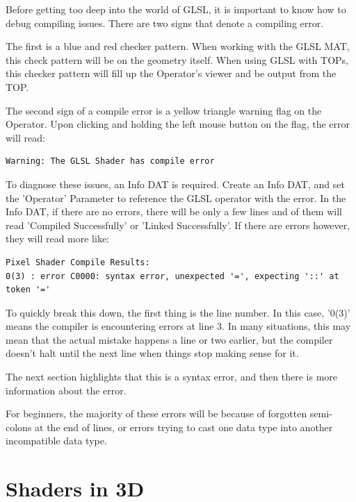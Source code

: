\begin{fullwidth}
Before getting too deep into the world of GLSL, it is important to know how to debug compiling issues. There are two signs that denote a compiling error.

The first is a blue and red checker pattern. When working with the GLSL MAT, this check pattern will be on the geometry itself. When using GLSL with TOPs, this checker pattern will fill up the Operator's viewer and be output from the TOP.

The second sign of a compile error is a yellow triangle warning flag on the Operator. Upon clicking and holding the left mouse button on the flag, the error will read:

\begin{lstlisting}
Warning: The GLSL Shader has compile error
\end{lstlisting}

To diagnose these issues, an Info DAT is required. Create an Info DAT, and set the 'Operator' Parameter to reference the GLSL operator with the error. In the Info DAT, if there are no errors, there will be only a few lines and of them will read 'Compiled Successfully' or 'Linked Successfully'. If there are errors however, they will read more like:

\begin{lstlisting}
Pixel Shader Compile Results:
0(3) : error C0000: syntax error, unexpected '=', expecting '::' at token '='
\end{lstlisting}

To quickly break this down, the first thing is the line number. In this case, '0(3)' means the compiler is encountering errors at line 3. In many situations, this may mean that the actual mistake happens a line or two earlier, but the compiler doesn't halt until the next line when things stop making sense for it.

The next section highlights that this is a syntax error, and then there is more information about the error.

For beginners, the majority of these errors will be because of forgotten semi-colons at the end of lines, or errors trying to cast one data type into another incompatible data type.


\end{fullwidth}


\section{Shaders in 3D}

